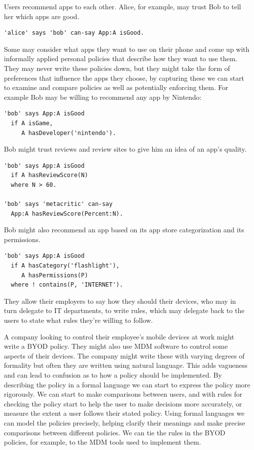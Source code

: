 \documentclass[thesis.tex]{subfiles}
\begin{document}
Users recommend apps to each other. Alice, for example, may trust Bob to tell
her which apps are good.
%
\begin{lstlisting}
'alice' says 'bob' can-say App:A isGood.
\end{lstlisting}
%
Some may consider what apps they want to use on their phone and come up with
informally applied personal policies that describe how they want to use them.
They may never write these policies down, but they might take the form of
preferences that influence the apps they choose, by capturing these we can start
to examine and compare policies as well as potentially enforcing them. For
example Bob may be willing to recommend any app by Nintendo:
%
\begin{lstlisting}
'bob' says App:A isGood
  if A isGame,
     A hasDeveloper('nintendo').
\end{lstlisting}
%
Bob might trust reviews and review sites to give him an idea of an app's quality. 
%
\begin{lstlisting}
'bob' says App:A isGood
  if A hasReviewScore(N)
  where N > 60.
 
'bob' says 'metacritic' can-say
  App:A hasReviewScore(Percent:N).
\end{lstlisting}
%
Bob might also recommend an app based on its app store categorization and its permissions.
%
\begin{lstlisting}
'bob' says App:A isGood
  if A hasCategory('flashlight'),
     A hasPermissions(P)
  where ! contains(P, 'INTERNET').
\end{lstlisting}

They allow their employers to say how they should their devices, who
may in turn delegate to IT departments, to write rules, which may
delegate back to the users to state what rules they're willing to
follow.

A company looking to control their employee's mobile devices at work might write
a \ac{BYOD} policy. They might also use \ac{MDM} software to control some
aspects of their devices. The company might write these with varying degrees of
formality but often they are written using natural language. This adds vagueness
and can lead to confusion as to how a policy should be implemented. By
describing the policy in a formal language we can start to express the policy
more rigorously. We can start to make comparisons between users, and with rules
for checking the policy start to help the user to make decisions more
accurately, or measure the extent a user follows their stated policy. Using
formal languages we can model the policies precisely, helping clarify their
meanings and make precise comparisons between different policies. We can tie the
rules in the \ac{BYOD} policies, for example, to the \ac{MDM} tools used to
implement them.
\end{document}
